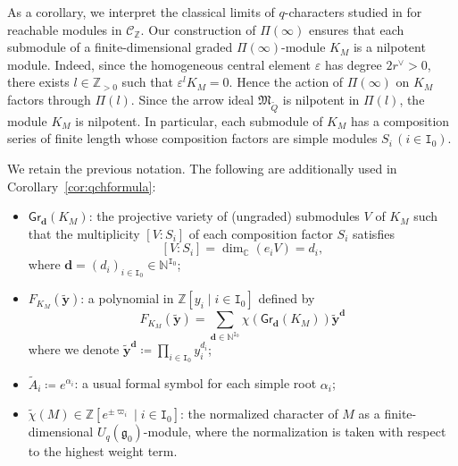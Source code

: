 \documentclass[12pt]{amsart}
\theoremstyle{definition}
\theoremstyle{remark}
\numberwithin{equation}{section}
\begin{document}
As a corollary, we interpret the classical limits of $q$-characters studied in \cite{FR99} for reachable modules in $\mathcal{C}_{\mathbb{Z}}$. Our construction of $\Pi(\infty)$ ensures that each submodule of a finite-dimensional graded $\Pi(\infty)$-module $K_M$ is a nilpotent module.
Indeed, since the homogeneous central element
$\varepsilon$ has degree $2r^\vee>0$, there exists $l\in \mathbb{Z}_{>0}$ such that
$\varepsilon^lK_M=0$. Hence the action of $\Pi(\infty)$ on $K_M$
factors through $\Pi(l)$. Since the arrow ideal
$\mathfrak M_{\widetilde Q}$ is nilpotent in $\Pi(l)$, the module
$K_M$ is nilpotent.
In particular, each submodule of $K_M$ has a composition series of finite length whose composition factors are simple modules $S_i\,(i\in \mathtt{I}_0)$. 

We retain the previous notation. The following are additionally used in Corollary~\ref{cor:qchformula}:
\begin{itemize}
    \item $\mathsf{Gr}_{\mathbf{d}}(K_M)$: the projective variety of (ungraded) submodules $V$ of $K_M$ such that the multiplicity $[V\colon S_i]$ of each composition factor $S_i$ satisfies
    \[[V\colon S_i]=\dim_{\mathbb{C}}(e_i V)= d_i,\]
    where $\mathbf{d}=(d_i)_{i\in \mathtt{I}_0}\in \mathbb{N}^{\mathtt{I}_0}$;
    \item $F_{K_M}(\widetilde{\mathbf{y}})$: a polynomial in $\mathbb{Z}[y_i\mid i\in \mathtt{I}_0]$ defined by
    \[F_{K_M}(\widetilde{\mathbf{y}})=\sum_{\mathbf{d}\in \mathbb{N}^{\mathtt{I}_0}}\chi(\mathsf{Gr}_{\mathbf{d}}(K_M))\widetilde{\mathbf{y}}^{\mathbf{d}}\]
    where we denote $\widetilde{\mathbf{y}}^{\mathbf{d}}\coloneqq \prod_{i\in \mathtt{I}_0}y_i^{d_i}$;
    \item $\widetilde{A}_i\coloneqq e^{\alpha_i}$: a usual formal symbol for each simple root $\alpha_i$;
    \item $\widetilde{\chi}(M)\in \mathbb{Z}[e^{\pm \varpi_i}\mid i\in \mathtt{I}_0]$: the normalized character of $M$ as a finite-dimensional $U_q(\mathfrak{g}_0)$-module, where the normalization is taken with respect to the highest weight term.
\end{itemize}
\end{document}
